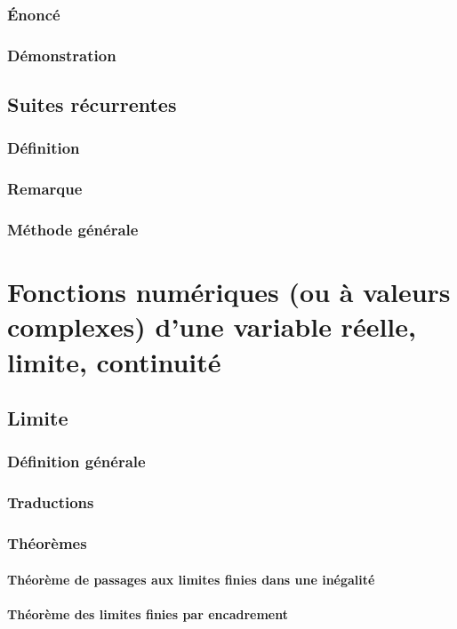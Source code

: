 \documentclass[12pt,a4paper,french]{book}
\begin{document}
		\subsection{Énoncé}
		\subsection{Démonstration}
	\section{Suites récurrentes}
		\subsection{Définition}
		\subsection{Remarque}
		\subsection{Méthode générale}
		
\chapter{Fonctions numériques (ou à valeurs complexes) d'une variable réelle, limite, continuité}
	\section{Limite}
		\subsection{Définition générale}
		\subsection{Traductions}
		\subsection{Théorèmes}
			\subsubsection{Théorème de passages aux limites finies dans une inégalité}
			\subsubsection{Théorème des limites finies par encadrement}
\end{document}
